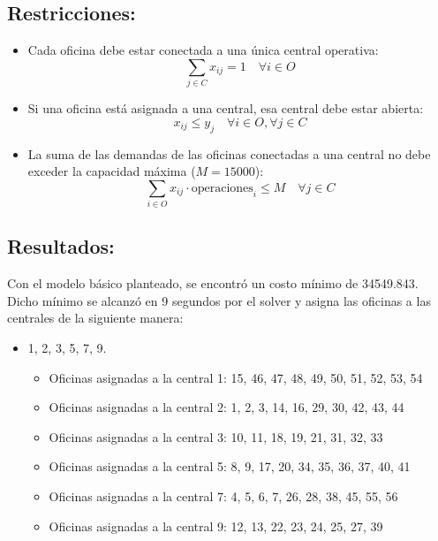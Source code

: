 \documentclass{article}
\begin{document}
\subsection*{Restricciones:}

\begin{itemize}
    \item Cada oficina debe estar conectada a una única central operativa:
    \[
    \sum_{j \in C} x_{ij} = 1 \quad \forall i \in O
    \]
    
    \item Si una oficina está asignada a una central, esa central debe estar abierta:
    \[
    x_{ij} \leq y_j \quad \forall i \in O, \forall j \in C
    \]

    \item La suma de las demandas de las oficinas conectadas a una central no debe exceder la capacidad máxima (\(M = 15000\)):
    \[
    \sum_{i \in O} x_{ij} \cdot \text{operaciones}_i \leq M \quad \forall j \in C
    \]
\end{itemize}

\subsection*{Resultados:}

Con el modelo básico planteado, se encontró un costo mínimo de 34549.843. Dicho mínimo se alcanzó en 9 segundos por el solver y asigna las oficinas a las centrales de la siguiente manera:
\vspace{0.5cm}

\begin{itemize}
    \item{} 1, 2, 3, 5, 7, 9.
	\begin{itemize}
	\item Oficinas asignadas a la central 1: 15, 46, 47, 48, 49, 50, 51, 52, 53, 54
	\item Oficinas asignadas a la central 2: 1, 2, 3, 14, 16, 29, 30, 42, 43, 44
	\item Oficinas asignadas a la central 3: 10, 11, 18, 19, 21, 31, 32, 33
	\item Oficinas asignadas a la central 5: 8, 9, 17, 20, 34, 35, 36, 37, 40, 41
	\item Oficinas asignadas a la central 7: 4, 5, 6, 7, 26, 28, 38, 45, 55, 56
	\item Oficinas asignadas a la central 9: 12, 13, 22, 23, 24, 25, 27, 39
	\end{itemize}
\end{itemize}
\end{document}
